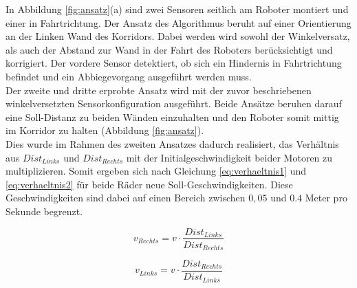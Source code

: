 \documentclass[12pt,a4paper,oneside]{article}
\begin{document}
\begin{spacing}{1.15}
In Abbildung \ref{fig:ansatz}(a) sind zwei Sensoren seitlich am Roboter montiert und einer in Fahrtrichtung. Der Ansatz des Algorithmus beruht auf einer Orientierung an der Linken Wand des Korridors. Dabei werden wird sowohl der Winkelversatz, als auch der Abstand zur Wand in der Fahrt des Roboters berücksichtigt und korrigiert. Der vordere Sensor detektiert, ob sich ein Hindernis in Fahrtrichtung befindet und ein Abbiegevorgang ausgeführt werden muss. \\
Der zweite und dritte erprobte Ansatz wird mit der zuvor beschriebenen winkelversetzten Sensorkonfiguration ausgeführt. Beide Ansätze beruhen darauf eine Soll-Distanz zu beiden Wänden einzuhalten und den Roboter somit mittig im Korridor zu halten (Abbildung \ref{fig:ansatz}). \\
Dies wurde im Rahmen des zweiten Ansatzes dadurch realisiert, das Verhältnis aus $Dist_{Links}$ und $Dist_{Rechts}$ mit der Initialgeschwindigkeit beider Motoren zu multiplizieren. Somit ergeben sich nach Gleichung \ref{eq:verhaeltnis1} und \ref{eq:verhaeltnis2} für beide Räder neue Soll-Geschwindigkeiten. Diese Geschwindigkeiten sind dabei auf einen Bereich zwischen $0,05$ und $0.4$ Meter pro Sekunde begrenzt.

\begin{center}
	\begin{equation}
	v_{Rechts} = v \cdot \frac{Dist_{Links}}{Dist_{Rechts}}
	\label{eq:verhaeltnis1}
	\end{equation}
\end{center}

\begin{center}
	\begin{equation}
	v_{Links} = v \cdot \frac{Dist_{Rechts}}{Dist_{Links}}
	\label{eq:verhaeltnis2}
	\end{equation}
\end{center} 


\end{spacing}
\end{document}
